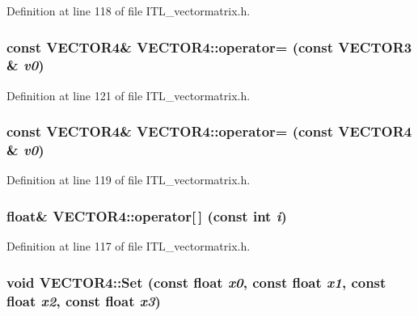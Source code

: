 Definition at line 118 of file ITL\_\-vectormatrix.h.

\hypertarget{classVECTOR4_aae94c42e8f57dda5b4c1807ed27adfb3}{
\subsubsection[{operator=}]{\setlength{\rightskip}{0pt plus 5cm}const {\bf VECTOR4}\& VECTOR4::operator= (const {\bf VECTOR3} \& {\em v0})}}
\label{classVECTOR4_aae94c42e8f57dda5b4c1807ed27adfb3}


Definition at line 121 of file ITL\_\-vectormatrix.h.

\hypertarget{classVECTOR4_ad3e6ce33ed055090082a2c3793f6a149}{
\subsubsection[{operator=}]{\setlength{\rightskip}{0pt plus 5cm}const {\bf VECTOR4}\& VECTOR4::operator= (const {\bf VECTOR4} \& {\em v0})}}
\label{classVECTOR4_ad3e6ce33ed055090082a2c3793f6a149}


Definition at line 119 of file ITL\_\-vectormatrix.h.

\hypertarget{classVECTOR4_ab1865df5dacd8b2f04a237abf70a57cf}{
\subsubsection[{operator[]}]{\setlength{\rightskip}{0pt plus 5cm}float\& VECTOR4::operator\mbox{[}$\,$\mbox{]} (const int {\em i})}}
\label{classVECTOR4_ab1865df5dacd8b2f04a237abf70a57cf}


Definition at line 117 of file ITL\_\-vectormatrix.h.

\hypertarget{classVECTOR4_a7caa8b37c7cd7350c04c66f31fb2d656}{
\subsubsection[{Set}]{\setlength{\rightskip}{0pt plus 5cm}void VECTOR4::Set (const float {\em x0}, \/  const float {\em x1}, \/  const float {\em x2}, \/  const float {\em x3})}}
\label{classVECTOR4_a7caa8b37c7cd7350c04c66f31fb2d656}


